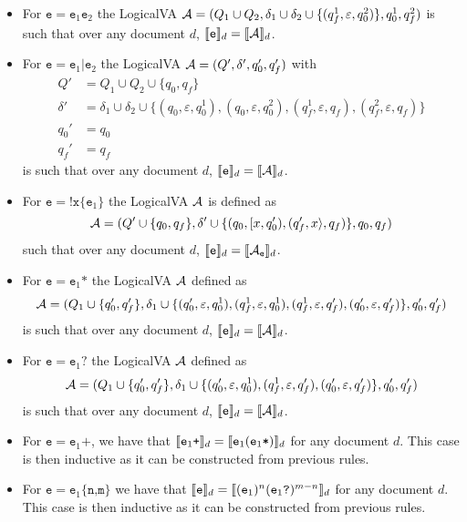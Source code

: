 \begin{itemize}
	\item For $\texttt{e} = \texttt{e}_1\texttt{e}_2$ the LogicalVA $\mathcal{A} = (Q_1
		      \cup Q_2, \delta_1 \cup \delta_2 \cup \{(q_f^1, \varepsilon,
		      q_0^2)\}, q_0^1, q_f^2)$ is such that over any document $d$,
		      $\llbracket\texttt{e}\rrbracket_d = \llbracket\mathcal{A}\rrbracket_d$.
	\item For $\texttt{e} = \texttt{e}_1\texttt{|}\texttt{e}_2$ the LogicalVA
	      $\mathcal{A} = (Q', \delta', q_0', q_f')$ with
	      \begin{align*}
		      Q'      & = Q_1 \cup Q_2 \cup \{q_0, q_f\}                                                                                                              \\
		      \delta' & = \delta_1 \cup \delta_2 \cup \{(q_0, \varepsilon, q_0^1), (q_0, \varepsilon, q_0^2), (q_f^1, \varepsilon, q_f), (q_f^2, \varepsilon, q_f) \} \\
		      q_0'    & = q_0                                                                                                                                         \\
		      q_f'    & = q_f
	      \end{align*}
	      is such that over any document $d$, $\llbracket\texttt{e}\rrbracket_d =
		      \llbracket\mathcal{A}\rrbracket_d$.
	\item For $\texttt{e} = \texttt{!x\{}\texttt{e}_1\texttt{\}}$ the LogicalVA
	      $\mathcal{A}$ is defined as
	      \[
		      \mathcal{A} = (Q' \cup \{q_0, q_f\},\delta' \cup \{(q_0, [x, q_0'), (q_f', x\rangle, q_f)\}, q_0, q_f)
	      \]
	      such that over any document $d$, $\llbracket\texttt{e}\rrbracket_d =
		      \llbracket\mathcal{A}_\texttt{e}\rrbracket_d$.
	\item For $\texttt{e} = \texttt{e}_1\texttt{*}$ the LogicalVA $\mathcal{A}$ defined
	      as
	      \[
		      \mathcal{A} = (Q_1 \cup \{q_0', q_f'\},
		      \delta_1 \cup \{(q_0', \varepsilon, q_0^1), (q_f^1, \varepsilon, q_0^1), (q_f^1, \varepsilon, q_f'), (q_0', \varepsilon, q_f')\},
		      q_0', q_f')
	      \]
	      is such that over any document $d$, $\llbracket\texttt{e}\rrbracket_d =
		      \llbracket\mathcal{A}\rrbracket_d$.
	\item For $\texttt{e} = \texttt{e}_1\texttt{?}$ the LogicalVA $\mathcal{A}$ defined
	as
	\[
		\mathcal{A} = (Q_1 \cup \{q_0', q_f'\},
		\delta_1 \cup \{(q_0', \varepsilon, q_0^1), (q_f^1, \varepsilon, q_f'), (q_0', \varepsilon, q_f')\},
		q_0', q_f')
	\]
	is such that over any document $d$, $\llbracket\texttt{e}\rrbracket_d =
		\llbracket\mathcal{A}\rrbracket_d$.
	\item For $\texttt{e} = \texttt{e}_1\texttt{+}$, we have that
	$\llbracket\texttt{e}_1\texttt{+}\rrbracket_{d} =
	\llbracket\texttt{e}_1(\texttt{e}_1\texttt{*})\rrbracket_{d}$ for any document $d$. This case
	is then inductive as it can be constructed from previous rules.
	\item For $\texttt{e} = \texttt{e}_1\texttt{\{n,m\}}$ we have that
	      $\llbracket\texttt{e}\rrbracket_d =
	      \llbracket(\texttt{e}_1)^n(\texttt{e}_1\texttt{?})^{m-n}\rrbracket_d$ for any
	      document $d$. This case is then inductive as it can be constructed
	      from previous rules.
\end{itemize}